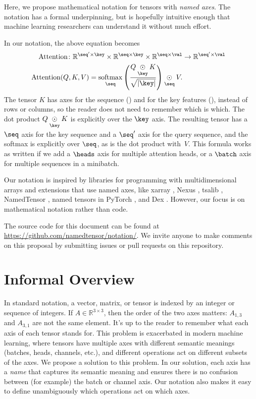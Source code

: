 \documentclass{article}
\newcommand{\reals}{\mathbb{R}}
\begin{document}
Here, we propose mathematical notation for tensors with \emph{named axes}. The notation has a formal underpinning, but is hopefully intuitive enough that machine learning researchers can understand it without much effort. 


In our notation, the above equation becomes
\begin{align*}
  \text{Attention} \colon \mathbb{R}^{\seq' \times \key} \times \mathbb{R}^{\seq \times \key} \times \mathbb{R}^{\seq \times\val} &\rightarrow \mathbb{R}^{\seq' \times \val} \\
  \text{Attention}(Q,K,V) = \nfun{\seq}{softmax} \left( \frac{Q \ndot{\key} K}{\sqrt{|\key|}} \right) \ndot{\seq} V.
\end{align*}
The tensor $K$ has axes for the sequence (\seq) and for the key features (\key), instead of rows or columns, so the reader does not need to remember which is which. The dot product $Q \ndot{\key} K$ is explicitly over the $\key$ axis. The resulting tensor has a $\seq$ axis for the key sequence and a $\seq'$ axis for the query sequence, and the softmax is explicitly over $\seq$, as is the dot product with~$V$.
This formula works as written if we add a $\heads$ axis for multiple attention heads, or a $\batch$ axis for multiple sequences in a minibatch.

Our notation is inspired by libraries for programming with multidimensional arrays \citep{numpy,pytorch} and extensions that use named axes, like xarray \citep{xarray}, Nexus \citep{chen2017typesafe}, tsalib \citep{tsalib}, NamedTensor \citep{namedtensor}, named tensors in PyTorch \citep{named-tensors}, and Dex \citep{maclaurin+:2019}. However, our focus is on mathematical notation rather than code.

The source code for this document can be found at \url{https://github.com/namedtensor/notation/}. We invite anyone to make comments on this proposal by submitting issues or pull requests on this repository.

\section{Informal Overview}
\label{sec:overview}

In standard notation, a vector, matrix, or tensor is indexed by an integer or sequence of integers. If $A \in \reals^{3\times3}$, then the order of the two axes matters: $A_{1,3}$ and $A_{3,1}$ are not the same element. It's up to the reader to remember what each axis of each tensor stands for. This problem is exacerbated in modern machine learning, where tensors have multiple axes with different semantic meanings (batches, heads, channels, etc.), and different operations act on different subsets of the axes. We propose a solution to this problem. In our solution, each axis has a \emph{name} that captures its semantic meaning and ensures there is no confusion between (for example) the batch or channel axis. Our notation also makes it easy to define unambiguously which operations act on which axes.
\end{document}

